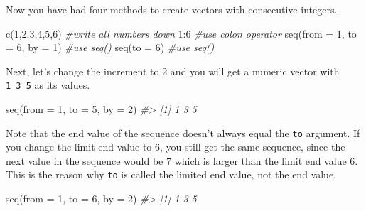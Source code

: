 \documentclass[
]{book}
\newenvironment{Shaded}{\begin{snugshade}}{\end{snugshade}}
\newcommand{\AttributeTok}[1]{\textcolor[rgb]{0.77,0.63,0.00}{#1}}
\newcommand{\CommentTok}[1]{\textcolor[rgb]{0.56,0.35,0.01}{\textit{#1}}}
\newcommand{\DecValTok}[1]{\textcolor[rgb]{0.00,0.00,0.81}{#1}}
\newcommand{\FunctionTok}[1]{\textcolor[rgb]{0.00,0.00,0.00}{#1}}
\newcommand{\NormalTok}[1]{#1}
\newcommand{\SpecialCharTok}[1]{\textcolor[rgb]{0.00,0.00,0.00}{#1}}
\newenvironment{blackbox}{
  \definecolor{shadecolor}{rgb}{0, 0, 0}  %
  \color{white}
  \begin{shaded}}
 {\end{shaded}}
\newenvironment{infobox}[1]
  {
  \begin{itemize}
  \renewcommand{\labelitemi}{
    \raisebox{-.7\height}[0pt][0pt]{
      {\setkeys{Gin}{width=3em,keepaspectratio}
        \texttt{[image: pics/\#1]}}
    }
  }
  \setlength{\fboxsep}{1em}
  \begin{blackbox}
  \item
  }
  {
  \end{blackbox}
  \end{itemize}
  }
\begin{document}
\begin{infobox}{caution}

Now you have had four methods to create vectors with consecutive integers.

\begin{Shaded}
\begin{Highlighting}[]
\FunctionTok{c}\NormalTok{(}\DecValTok{1}\NormalTok{,}\DecValTok{2}\NormalTok{,}\DecValTok{3}\NormalTok{,}\DecValTok{4}\NormalTok{,}\DecValTok{5}\NormalTok{,}\DecValTok{6}\NormalTok{)                }\CommentTok{\#write all numbers down}
\DecValTok{1}\SpecialCharTok{:}\DecValTok{6}                           \CommentTok{\#use colon operator}
\FunctionTok{seq}\NormalTok{(}\AttributeTok{from =} \DecValTok{1}\NormalTok{, }\AttributeTok{to =} \DecValTok{6}\NormalTok{, }\AttributeTok{by =} \DecValTok{1}\NormalTok{) }\CommentTok{\#use seq()}
\FunctionTok{seq}\NormalTok{(}\AttributeTok{to =} \DecValTok{6}\NormalTok{)                   }\CommentTok{\#use seq()}
\end{Highlighting}
\end{Shaded}

\end{infobox}

Next, let's change the increment to 2 and you will get a numeric vector with \texttt{1\ 3\ 5} as its values.

\begin{Shaded}
\begin{Highlighting}[]
\FunctionTok{seq}\NormalTok{(}\AttributeTok{from =} \DecValTok{1}\NormalTok{, }\AttributeTok{to =} \DecValTok{5}\NormalTok{, }\AttributeTok{by =} \DecValTok{2}\NormalTok{)}
\CommentTok{\#\textgreater{} [1] 1 3 5}
\end{Highlighting}
\end{Shaded}

Note that the end value of the sequence doesn't always equal the \texttt{to} argument. If you change the limit end value to 6, you still get the same sequence, since the next value in the sequence would be 7 which is larger than the limit end value 6. This is the reason why \texttt{to} is called the limited end value, not the end value.

\begin{Shaded}
\begin{Highlighting}[]
\FunctionTok{seq}\NormalTok{(}\AttributeTok{from =} \DecValTok{1}\NormalTok{, }\AttributeTok{to =} \DecValTok{6}\NormalTok{, }\AttributeTok{by =} \DecValTok{2}\NormalTok{) }
\CommentTok{\#\textgreater{} [1] 1 3 5}
\end{Highlighting}
\end{Shaded}
\end{document}
